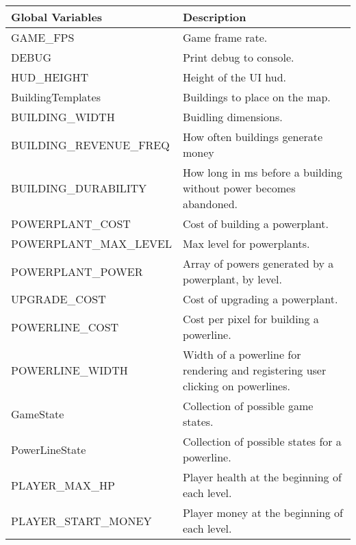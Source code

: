 	\begin{table}[H]
	\begin{tabular}{p{6cm} | p{6cm} }

	\hline
	\rowcolor{gray}
	Global Variables & Description \\ \hline
	GAME\_FPS & Game frame rate. \\ \hline
	DEBUG & Print debug to console. \\ \hline
	HUD\_HEIGHT & Height of the UI hud. \\ \hline
	BuildingTemplates & Buildings to place on the map. \\ \hline
	BUILDING\_WIDTH & Buidling dimensions. \\ \hline
	BUILDING\_REVENUE\_FREQ & How often buildings generate money \\ \hline
	BUILDING\_DURABILITY & How long in ms before a building without power becomes abandoned. \\ \hline
	POWERPLANT\_COST & Cost of building a powerplant. \\ \hline
	POWERPLANT\_MAX\_LEVEL & Max level for powerplants. \\ \hline
	POWERPLANT\_POWER & Array of powers generated by a powerplant, by level. \\ \hline
	UPGRADE\_COST & Cost of upgrading a powerplant. \\ \hline
	POWERLINE\_COST & Cost per pixel for building a powerline. \\ \hline
	POWERLINE\_WIDTH & Width of a powerline for rendering and registering user clicking on powerlines. \\ \hline
	GameState & Collection of possible game states. \\ \hline
	PowerLineState & Collection of possible states for a powerline. \\ \hline
	PLAYER\_MAX\_HP & Player health at the beginning of each level. \\ \hline
	PLAYER\_START\_MONEY & Player money at the beginning of each level. \\ \hline

	\end{tabular}
	\end{table}
